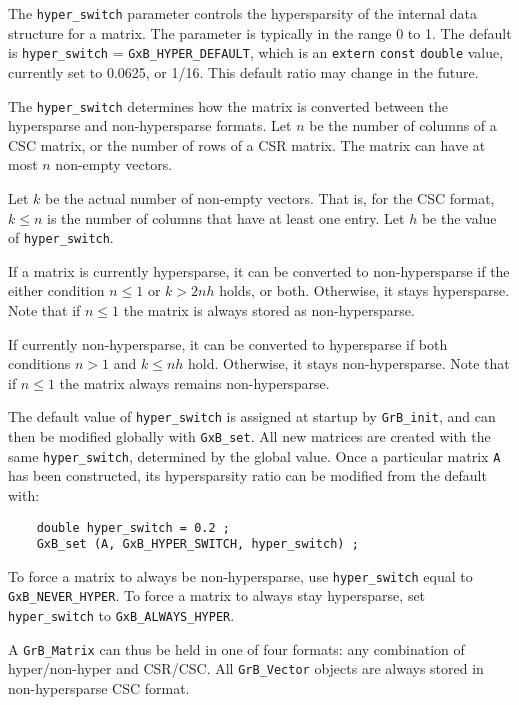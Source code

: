 \documentclass[12pt]{article}
\begin{document}
The \verb'hyper_switch' parameter controls the hypersparsity of the internal
data structure for a matrix.  The parameter is typically in the range 0 to 1.
The default is \verb'hyper_switch' = \verb'GxB_HYPER_DEFAULT', which is an
\verb'extern' \verb'const' \verb'double' value, currently set to 0.0625, or
1/16.  This default ratio may change in the future.

The \verb'hyper_switch' determines how the matrix is converted between the
hypersparse and non-hypersparse formats.  Let $n$ be the number of columns of a
CSC matrix, or the number of rows of a CSR matrix.  The matrix can have at most
$n$ non-empty vectors.

Let $k$ be the actual number of non-empty vectors.  That is, for the CSC
format, $k \le n$ is the number of columns that have at least one entry.  Let
$h$ be the value of \verb'hyper_switch'.

If a matrix is currently hypersparse, it can be converted to non-hypersparse if
the either condition $n \le 1$ or $k > 2nh$ holds, or both.  Otherwise, it
stays hypersparse.  Note that if $n \le 1$ the matrix is always stored as
non-hypersparse.

If currently non-hypersparse, it can be converted to hypersparse if
both conditions $n > 1$ and $k \le nh$ hold.  Otherwise, it stays
non-hypersparse.  Note that if $n \le 1$ the matrix always remains
non-hypersparse.

The default value of \verb'hyper_switch' is assigned at startup by
\verb'GrB_init', and can then be modified globally with \verb'GxB_set'.  All
new matrices are created with the same \verb'hyper_switch', determined by the
global value.  Once a particular matrix \verb'A' has been constructed, its
hypersparsity ratio can be modified from the default with:

    {\footnotesize
    \begin{verbatim}
    double hyper_switch = 0.2 ;
    GxB_set (A, GxB_HYPER_SWITCH, hyper_switch) ; \end{verbatim}}

To force a matrix to always be non-hypersparse, use \verb'hyper_switch' equal to
\verb'GxB_NEVER_HYPER'.  To force a matrix to always stay hypersparse, set
\verb'hyper_switch' to \verb'GxB_ALWAYS_HYPER'.

A \verb'GrB_Matrix' can thus be held in one of four formats: any combination of
hyper/non-hyper and CSR/CSC.  All \verb'GrB_Vector' objects are always stored
in non-hypersparse CSC format.
\end{document}
